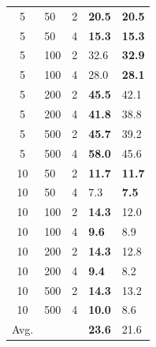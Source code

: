 \begin{table}[t]
\begin{minipage}{0.4\textwidth}
{\begin{tabular}{cll|ll}
				\hline
 5 &  50 & 2 & \textbf{20.5} & \textbf{20.5} \\
5 &  50 & 4 & \textbf{15.3} & \textbf{15.3} \\
 5 & 100 & 2 & 32.6 & \textbf{32.9} \\
 5 & 100 & 4 & 28.0 & \textbf{28.1} \\
 5 & 200 & 2 & \textbf{45.5} & 42.1 \\
 5 & 200 & 4 & \textbf{41.8} & 38.8 \\
 5 & 500 & 2 & \textbf{45.7} & 39.2 \\
 5 & 500 & 4 & \textbf{58.0} & 45.6 \\ \hline
 10 &  50 & 2 & \textbf{11.7} & \textbf{11.7} \\
 10 &  50 & 4 & 7.3 & \textbf{7.5} \\
 10 & 100 & 2 & \textbf{14.3} & 12.0 \\
 10 & 100 & 4 & \textbf{9.6} & 8.9 \\
 10 & 200 & 2 & \textbf{14.3} & 12.8 \\
 10 & 200 & 4 & \textbf{9.4} & 8.2 \\
 10 & 500 & 2 & \textbf{14.3} & 13.2 \\
 10 & 500 & 4 & \textbf{10.0} & 8.6 \\
				\hline \hline
Avg. &    &   &   \textbf{23.6}    & 21.6 \\ \hline \hline
		\end{tabular}}
	\end{minipage}
	\vspace{-0.5cm}
\end{table}